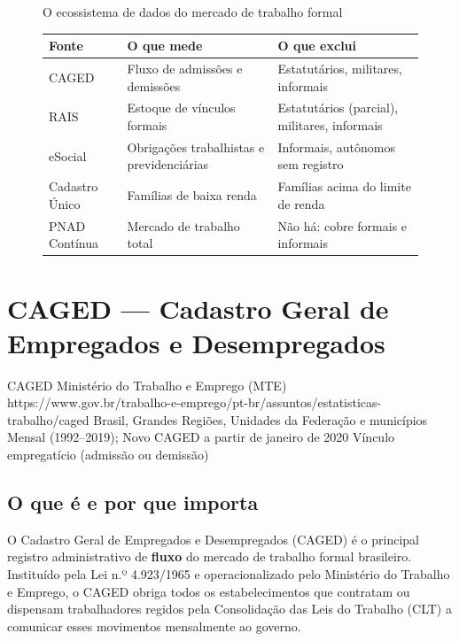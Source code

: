 \begin{figure}[H]
\centering
\begin{boxdestaque}{O ecossistema de dados do mercado de trabalho formal}
\begin{center}
\begin{tabular}{@{} p{4cm} p{3.5cm} p{5.5cm} @{}}
\toprule
\textbf{Fonte} & \textbf{O que mede} & \textbf{O que exclui} \\
\midrule
CAGED & Fluxo de admissões e demissões & Estatutários, militares, informais \\
RAIS  & Estoque de vínculos formais & Estatutários (parcial), militares, informais \\
eSocial & Obrigações trabalhistas e previdenciárias & Informais, autônomos sem registro \\
Cadastro Único & Famílias de baixa renda & Famílias acima do limite de renda \\
PNAD Contínua & Mercado de trabalho total & Não há: cobre formais e informais \\
\bottomrule
\end{tabular}
\end{center}
\end{boxdestaque}
\end{figure}

\section{CAGED — Cadastro Geral de Empregados e Desempregados}

\ficharapida
  {CAGED}
  {Ministério do Trabalho e Emprego (MTE)}
  {https://www.gov.br/trabalho-e-emprego/pt-br/assuntos/estatisticas-trabalho/caged}
  {Brasil, Grandes Regiões, Unidades da Federação e municípios}
  {Mensal (1992--2019); Novo CAGED a partir de janeiro de 2020}
  {Vínculo empregatício (admissão ou demissão)}

\subsection{O que é e por que importa}

O Cadastro Geral de Empregados e Desempregados (CAGED) é o principal registro administrativo de \textbf{fluxo} do mercado de trabalho formal brasileiro. Instituído pela Lei n.º 4.923/1965 e operacionalizado pelo Ministério do Trabalho e Emprego, o CAGED obriga todos os estabelecimentos que contratam ou dispensam trabalhadores regidos pela Consolidação das Leis do Trabalho (CLT) a comunicar esses movimentos mensalmente ao governo.

